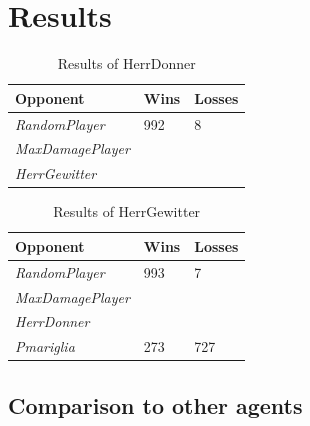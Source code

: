 \section{Results}

\begin{table}[h]
    \centering
    \begin{tabular}{|l|l|l|}
    \hline 
    \textbf{Opponent}      & Wins & Losses \\
    \hline 
    \emph{RandomPlayer}    & 992  & 8      \\
    \hline 
    \emph{MaxDamagePlayer} &      &        \\
    \hline 
    \emph{HerrGewitter}    &      &        \\
    \hline 
    \end{tabular}
    \caption{Results of HerrDonner}
    \label{tab:HerrDonner}
\end{table}
\begin{table}[h]
    \centering
    \begin{tabular}{|l|l|l|}
    \hline 
    \textbf{Opponent}      & Wins   & Losses \\
    \hline 
    \emph{RandomPlayer}    & 993    & 7 \\
    \hline 
    \emph{MaxDamagePlayer} &        &        \\
    \hline 
    \emph{HerrDonner}       &       &        \\
    \hline 
    \emph{Pmariglia}        & 273   & 727 \\
    \hline
    \end{tabular}
    \caption{Results of HerrGewitter}
    \label{tab:HerrGewitter}
\end{table}

\subsection{Comparison to other agents}

